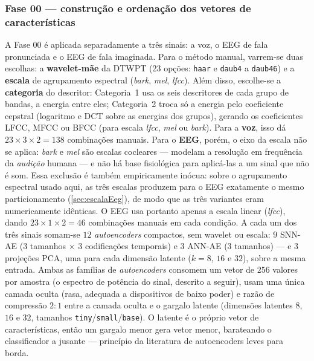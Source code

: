			\subsubsection{Fase 00 --- construção e ordenação dos vetores de características}

				\par A Fase 00 é aplicada separadamente a três sinais: a voz, o \ac{EEG} de fala pronunciada e o \ac{EEG} de fala imaginada. Para o método manual, varrem-se duas escolhas: a \textbf{wavelet-mãe} da DTWPT (23 opções: \texttt{haar} e \texttt{daub4} a \texttt{daub46}) e a \textbf{escala} de agrupamento espectral (\textit{bark}, \textit{mel}, \textit{lfcc}). Além disso, escolhe-se a \textbf{categoria} do descritor: Categoria~1 usa os seis descritores de cada grupo de bandas, a energia entre eles; Categoria~2 troca só a energia pelo coeficiente cepstral (logaritmo e DCT sobre as energias dos grupos), gerando os coeficientes LFCC, MFCC ou BFCC (para escala \textit{lfcc}, \textit{mel} ou \textit{bark}). Para a \textbf{voz}, isso dá $23 \times 3 \times 2 = 138$ combinações manuais. Para o \textbf{EEG}, porém, o eixo da escala não se aplica: \textit{bark} e \textit{mel} são escalas cocleares --- modelam a resolução em frequência da \emph{audição} humana --- e não há base fisiológica para aplicá-las a um sinal que não é som. Essa exclusão é também empiricamente inócua: sobre o agrupamento espectral usado aqui, as três escalas produzem para o EEG exatamente o mesmo particionamento (\autoref{sec:escalaEeg}), de modo que as três variantes eram numericamente idênticas. O EEG usa portanto apenas a escala linear (\textit{lfcc}), dando $23 \times 1 \times 2 = 46$ combinações manuais em cada condição. A cada um dos três sinais somam-se $12$ \textit{autoencoders} compactos, sem wavelet ou escala: $9$ SNN-AE ($3$ tamanhos $\times$ $3$ codificações temporais) e $3$ ANN-AE ($3$ tamanhos) --- e $3$ projeções \ac{PCA}, uma para cada dimensão latente ($k = 8$, $16$ e $32$), sobre a mesma entrada. Ambas as famílias de \textit{autoencoders} consomem um vetor de $256$ valores por amostra (o espectro de potência do sinal, descrito a seguir), usam uma única camada oculta (rasa, adequada a dispositivos de baixo poder) e razão de compressão $2\!:\!1$ entre a camada oculta e o gargalo latente (dimensões latentes $8$, $16$ e $32$, tamanhos \texttt{tiny}/\texttt{small}/\texttt{base}). O latente é o próprio vetor de características, então um gargalo menor gera vetor menor, barateando o classificador a jusante --- princípio da literatura de autoencoders leves para borda.

